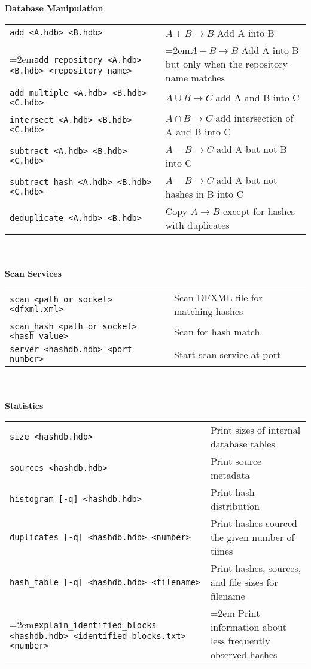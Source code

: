 \documentclass[12pt]{article}
\begin{document}
\textbf{Database Manipulation} \\
\begin{tabular}{p{3.6 in} p{3.4 in}}
\small\texttt{add <A.hdb> <B.hdb>} & $A + B \rightarrow B$ Add A into B \\
\hangindent=2em\small\texttt{add\_repository <A.hdb> <B.hdb> <repository name>} & \hangindent=2em$A + B \rightarrow B$ Add A into B but only when the repository name matches \\
\small\texttt{add\_multiple <A.hdb> <B.hdb> <C.hdb>} & $A \cup B \rightarrow C$ add A and B into C\\
\small\texttt{intersect <A.hdb> <B.hdb> <C.hdb>} & $A \cap B \rightarrow C$ add intersection of A and B into C\\
\small\texttt{subtract <A.hdb> <B.hdb> <C.hdb>} & $A - B \rightarrow C$ add A but not B into C\\
\small\texttt{subtract\_hash <A.hdb> <B.hdb> <C.hdb>} & $A - B \rightarrow C$ add A but not hashes in B into C\\
\small\texttt{deduplicate <A.hdb> <B.hdb>} & Copy $A \rightarrow B$ except for hashes with duplicates \\
\end{tabular}
\\
\\
\textbf{Scan Services} \\
\begin{tabular}{p{3.6 in} p{4 in}}
\small\texttt{scan <path or socket> <dfxml.xml>} & Scan DFXML file for matching hashes \\
\small\texttt{scan\_hash <path or socket> <hash value>} & Scan for hash match \\
\small\texttt{server <hashdb.hdb> <port number>} & Start scan service at port\\
\end{tabular}
\\
\\
\textbf{Statistics}\\
\begin{tabular}{p{3.6 in} p{3.6 in}}
\small\small\texttt{size <hashdb.hdb>} & Print sizes of internal database tables \\
\small\texttt{sources <hashdb.hdb>} & Print source metadata \\
\small\texttt{histogram [-q] <hashdb.hdb>} & Print hash distribution \\
\small\texttt{duplicates [-q] <hashdb.hdb> <number>} & Print hashes sourced the given number of times \\
\small\texttt{hash\_table [-q] <hashdb.hdb> <filename>} & Print hashes, sources, and file sizes for filename\\
\hangindent=2em\small\texttt{explain\_identified\_blocks <hashdb.hdb> <identified\_blocks.txt> <number>} & \hangindent=2em Print information about less frequently observed hashes\\
\end{tabular}
\end{document}
